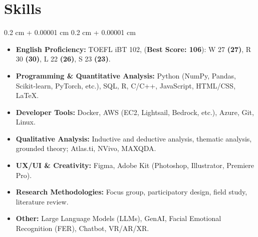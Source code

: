 \documentclass[10pt, letterpaper]{article}
\newenvironment{highlights}{
    \begin{itemize}[
        topsep=0.10 cm,
        parsep=0.10 cm,
        partopsep=0pt,
        itemsep=0pt,
        leftmargin=0.4 cm + 10pt
    ]
}{
    \end{itemize}
} %
\newenvironment{onecolentry}{
    \begin{adjustwidth}{
        0.2 cm + 0.00001 cm
    }{
        0.2 cm + 0.00001 cm
    }
}{
    \end{adjustwidth}
} %
\newenvironment{twocolentry}[2][]{
    \onecolentry
    \def\secondColumn{#2}
    \setcolumnwidth{\fill, 4.5 cm}
    \begin{paracol}{2}
}{
    \switchcolumn \raggedleft \secondColumn
    \end{paracol}
    \endonecolentry
} %
\begin{document}


    \section{Skills}

        \begin{onecolentry}
            \begin{highlights}                
                \item \textbf{English Proficiency:} TOEFL iBT 102, (\textbf{Best Score: 106}): W 27 \textbf{(27)}, R 30 \textbf{(30)}, L 22 \textbf{(26)}, S 23 \textbf{(23)}.
                \item \textbf{Programming \& Quantitative Analysis:} Python (NumPy, Pandas, Scikit-learn, PyTorch, etc.), SQL, R, C/C++, JavaScript, HTML/CSS, LaTeX.
                \item \textbf{Developer Tools:} Docker, AWS (EC2, Lightsail, Bedrock, etc.), Azure, Git, Linux.
                \item \textbf{Qualitative Analysis:} Inductive and deductive analysis, thematic analysis, grounded theory; Atlas.ti, NVivo, MAXQDA.
                \item \textbf{UX/UI \& Creativity:} Figma, Adobe Kit (Photoshop, Illustrator, Premiere Pro).
                \item \textbf{Research Methodologies:} Focus group, participatory design, field study, literature review.
                \item \textbf{Other:} Large Language Models (LLMs), GenAI, Facial Emotional Recognition (FER), Chatbot, VR/AR/XR.
            \end{highlights}
        \end{onecolentry}
\end{document}
